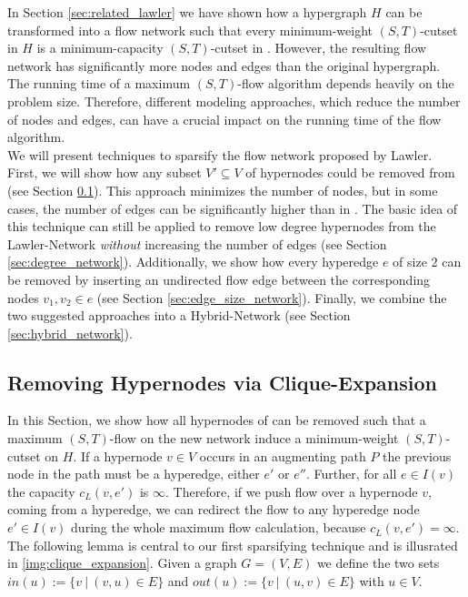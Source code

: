 
In Section \ref{sec:related_lawler} we have shown how a hypergraph $H$ can be transformed into 
a flow network  such that every minimum-weight $(S,T)$-cutset in $H$ is a
minimum-capacity $(S,T)$-cutset in  \cite{lawler1973}. However, the resulting flow
network has significantly more nodes and edges than the original hypergraph. The running time
of a maximum $(S,T)$-flow algorithm depends heavily on the problem size. 
Therefore, different modeling approaches, which reduce the number of nodes and edges,
can have a crucial impact on the running time of the flow algorithm. \\
We will present techniques to sparsify the flow network 
proposed by Lawler. First, we will show how any subset $V' \subseteq V$ of hypernodes could be removed 
from  (see Section \ref{sec:heuer_network}). This approach minimizes
the number of nodes, but in some cases, the number of edges can be
significantly higher than in . The basic idea of this technique 
can still be applied to remove low degree hypernodes from the Lawler-Network \emph{without} 
increasing the number of edges (see Section \ref{sec:degree_network}). Additionally, we show
how every hyperedge $e$ of size $2$ can be removed by inserting an undirected flow edge between
the corresponding nodes $v_1,v_2 \in e$  (see Section \ref{sec:edge_size_network}). 
Finally, we combine the two suggested approaches into a Hybrid-Network 
(see Section \ref{sec:hybrid_network}).



\subsection{Removing Hypernodes via Clique-Expansion}
\label{sec:heuer_network}

In this Section, we show how all hypernodes of  can be removed such that a maximum 
$(S,T)$-flow on the new network induce a minimum-weight $(S,T)$-cutset on $H$. If a hypernode $v \in V$
occurs in an augmenting path $P$ the previous node in the path must be a hyperedge, either
$e'$ or $e''$. Further, for all $e \in I(v)$ the capacity $c_L(v,e')$ is $\infty$. Therefore, 
if we push flow over a hypernode $v$, coming from a hyperedge, we can redirect
the flow to any hyperedge node $e' \in I(v)$ during the whole maximum flow calculation, because 
$c_L(v,e') = \infty$. The following lemma is central to our first sparsifying 
technique and is illusrated in \autoref{img:clique_expansion}. Given a graph $G = (V,E)$ we define the two sets
$in(u) := \{v\ |\ (v,u) \in E\}$ and $out(u) := \{v\ |\ (u,v) \in E\}$ with $u \in V$. 

